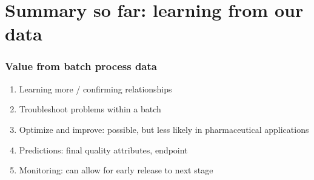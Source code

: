 \section{Summary so far: learning from our data}

\begin{frame}\frametitle{Value from batch process data}
\begin{enumerate}
	
	
	\item 	Learning more / confirming relationships
	\item 	Troubleshoot problems within a batch
	\item 	Optimize and improve: possible, but less likely in pharmaceutical applications
	\item 	Predictions: final quality attributes, endpoint
	\item 	Monitoring: can allow for early release to next stage	
\end{enumerate}
\end{frame}

